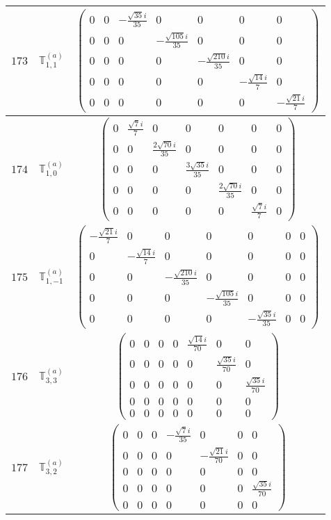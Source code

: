 \documentclass[fleqn,8pt,landscape]{jsarticle}
\begin{document}
\begin{center}
\begin{longtable}{ccc}
$ 173 $ & $ \mathbb{T}_{1,1}^{(a)} $ & $ \begin{pmatrix} 0 & 0 & - \frac{\sqrt{35} i}{35} & 0 & 0 & 0 & 0 \\ 0 & 0 & 0 & - \frac{\sqrt{105} i}{35} & 0 & 0 & 0 \\ 0 & 0 & 0 & 0 & - \frac{\sqrt{210} i}{35} & 0 & 0 \\ 0 & 0 & 0 & 0 & 0 & - \frac{\sqrt{14} i}{7} & 0 \\ 0 & 0 & 0 & 0 & 0 & 0 & - \frac{\sqrt{21} i}{7} \end{pmatrix} $ \\ \hline
$ 174 $ & $ \mathbb{T}_{1,0}^{(a)} $ & $ \begin{pmatrix} 0 & \frac{\sqrt{7} i}{7} & 0 & 0 & 0 & 0 & 0 \\ 0 & 0 & \frac{2 \sqrt{70} i}{35} & 0 & 0 & 0 & 0 \\ 0 & 0 & 0 & \frac{3 \sqrt{35} i}{35} & 0 & 0 & 0 \\ 0 & 0 & 0 & 0 & \frac{2 \sqrt{70} i}{35} & 0 & 0 \\ 0 & 0 & 0 & 0 & 0 & \frac{\sqrt{7} i}{7} & 0 \end{pmatrix} $ \\ \hline
$ 175 $ & $ \mathbb{T}_{1,-1}^{(a)} $ & $ \begin{pmatrix} - \frac{\sqrt{21} i}{7} & 0 & 0 & 0 & 0 & 0 & 0 \\ 0 & - \frac{\sqrt{14} i}{7} & 0 & 0 & 0 & 0 & 0 \\ 0 & 0 & - \frac{\sqrt{210} i}{35} & 0 & 0 & 0 & 0 \\ 0 & 0 & 0 & - \frac{\sqrt{105} i}{35} & 0 & 0 & 0 \\ 0 & 0 & 0 & 0 & - \frac{\sqrt{35} i}{35} & 0 & 0 \end{pmatrix} $ \\ \hline
$ 176 $ & $ \mathbb{T}_{3,3}^{(a)} $ & $ \begin{pmatrix} 0 & 0 & 0 & 0 & \frac{\sqrt{14} i}{70} & 0 & 0 \\ 0 & 0 & 0 & 0 & 0 & \frac{\sqrt{35} i}{70} & 0 \\ 0 & 0 & 0 & 0 & 0 & 0 & \frac{\sqrt{35} i}{70} \\ 0 & 0 & 0 & 0 & 0 & 0 & 0 \\ 0 & 0 & 0 & 0 & 0 & 0 & 0 \end{pmatrix} $ \\ \hline
$ 177 $ & $ \mathbb{T}_{3,2}^{(a)} $ & $ \begin{pmatrix} 0 & 0 & 0 & - \frac{\sqrt{7} i}{35} & 0 & 0 & 0 \\ 0 & 0 & 0 & 0 & - \frac{\sqrt{21} i}{70} & 0 & 0 \\ 0 & 0 & 0 & 0 & 0 & 0 & 0 \\ 0 & 0 & 0 & 0 & 0 & 0 & \frac{\sqrt{35} i}{70} \\ 0 & 0 & 0 & 0 & 0 & 0 & 0 \end{pmatrix} $ \\ \hline

\end{longtable}
\end{center}
\end{document}
